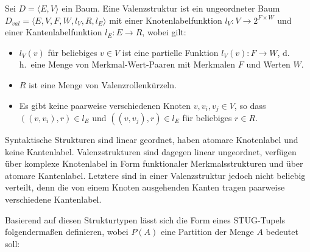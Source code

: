 \begin{definition}[Valenzstruktur]
Sei $D = \langle E,V \rangle$ ein Baum. Eine Valenzstruktur ist ein ungeordneter Baum $D_{val} = \langle E,V,F,W,l_V,R,l_E \rangle$ mit einer Knotenlabelfunktion $l_V : V \to 2^{F \times W}$ und einer Kantenlabelfunktion $l_E: E \to R$, wobei gilt:
\begin{itemize} 
  \item $l_V(v)$ für beliebiges $v \in V$ ist eine partielle Funktion $l_V(v): F \to W$, d.\,h.\ eine Menge von Merkmal-Wert-Paaren mit Merkmalen $F$ und Werten $W$.
  \item $R$ ist eine Menge von Valenzrollenkürzeln.
  \item Es gibt keine paarweise verschiedenen Knoten $v,v_i,v_j \in V$, so dass \\ $((v,v_i),r) \in l_E$ und $((v,v_j),r) \in l_E$ für beliebiges $r \in R$.
\end{itemize}  
\end{definition}
Syntaktische Strukturen sind linear geordnet, haben atomare Knotenlabel und keine Kantenlabel. Valenzstrukturen sind dagegen linear ungeordnet, verfügen über komplexe Knotenlabel in Form funktionaler Merkmalsstrukturen und über atomare Kantenlabel. Letztere sind in einer Valenzstruktur jedoch nicht beliebig verteilt, denn die von einem Knoten ausgehenden Kanten tragen paarweise verschiedene Kantenlabel.	

Basierend auf diesen Strukturtypen lässt sich die Form eines STUG-Tupels folgenderma\ss en definieren, wobei $P(A)$ eine Partition der Menge $A$ bedeutet soll:

